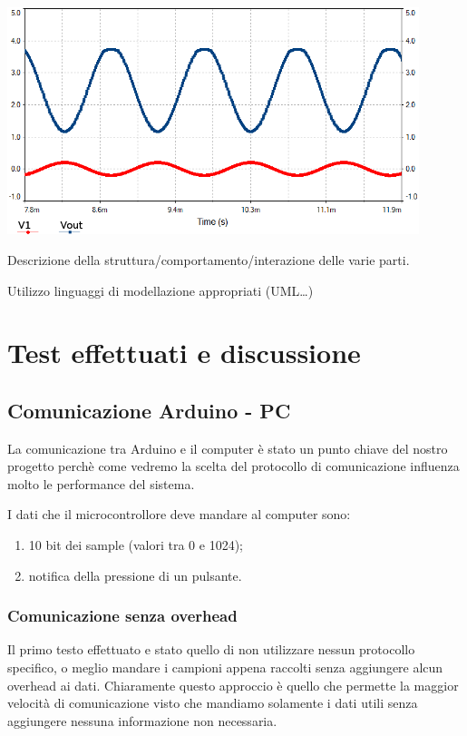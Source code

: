 \documentclass[a4paper,11pt]{article}
\begin{document}
\begin{center}
\includegraphics[width=0.9\textwidth]{screen2.png}
\end{center}

Descrizione della struttura/comportamento/interazione delle varie parti.

Utilizzo linguaggi di modellazione appropriati (UML…)

\section{Test effettuati e discussione}

\subsection{Comunicazione Arduino - PC}
La comunicazione tra Arduino e il computer è stato un punto chiave del nostro progetto perchè come vedremo la scelta del protocollo di comunicazione influenza molto le performance del sistema.

I dati che il microcontrollore deve mandare al computer sono:
\begin{enumerate}
    \item 10 bit dei sample (valori tra 0 e 1024);
    \item notifica della pressione di un pulsante.
\end{enumerate}

\subsubsection{Comunicazione senza overhead}
Il primo testo effettuato e stato quello di non utilizzare nessun protocollo specifico, o meglio mandare i campioni appena raccolti senza aggiungere alcun overhead ai dati. Chiaramente questo approccio è quello che permette la maggior velocità di comunicazione visto che mandiamo solamente i dati utili senza aggiungere nessuna informazione non necessaria.
\end{document}
